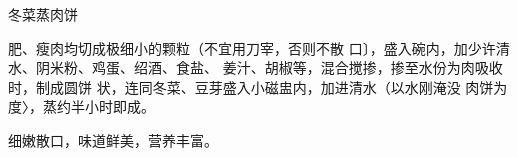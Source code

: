 \begin{recipe}{冬菜蒸肉饼}

\ingredients


\cooking

肥、瘦肉均切成极细小的颗粒（不宜用刀宰，否则不散 口〕，盛入碗内，加少许清水、阴米粉、鸡蛋、绍酒、食盐、 姜汁、胡椒等，混合搅掺，掺至水份为肉吸收时，制成圆饼 状，连同冬菜、豆芽盛入小磁盅内，加进清水（以水刚淹没 肉饼为度〉，蒸约半小时即成。

\notes

细嫩散口，味道鲜美，营养丰富。

\end{recipe}

